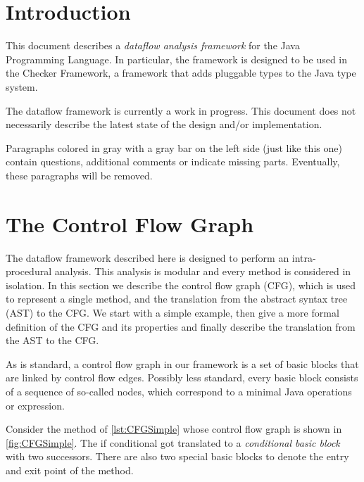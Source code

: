 
\section{Introduction}

This document describes a \emph{dataflow analysis framework} for the Java Programming Language.
In particular, the framework is designed to be used in the Checker Framework, a framework
that adds pluggable types to the Java type system.

\begin{workinprogress}
    The dataflow framework is currently a work in progress. This document does not necessarily describe
    the latest state of the design and/or implementation.
    
    Paragraphs colored in gray with a gray bar on the left side (just like this one)
    contain questions, additional comments or indicate missing parts. Eventually, these
    paragraphs will be removed.
\end{workinprogress}






\section{The Control Flow Graph}
\label{sec:cfg}


The dataflow framework described here is designed to perform an intra-procedural analysis.
This analysis is modular and every method is considered in isolation. In this section
we describe the control flow graph (CFG), which is used to represent a single method, and the
translation from the abstract syntax tree (AST) to the CFG. We start with a simple
example, then give a more formal definition of the CFG and its properties and finally
describe the translation from the AST to the CFG.

As is standard, a control flow graph in our framework is a set of basic blocks
that are linked by control flow edges. Possibly less standard,
every basic block consists of a sequence
of so-called nodes, which correspond to a minimal Java operations or expression.



Consider the method  of \autoref{lst:CFGSimple} whose control
flow graph is shown in \autoref{fig:CFGSimple}. The if conditional got translated to
a \emph{conditional basic block} with two successors. There are also two
special basic blocks to denote the entry and exit point of the method.


